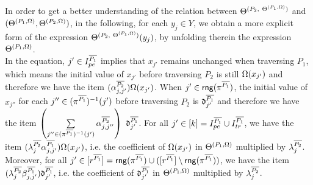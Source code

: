 In order to get a better understanding of the relation between $\Theta^{(P_2,\ \Theta^{(P_1,\Omega)})}$ and $(\Theta^{(P_1, \Omega)},\Theta^{(P_2, \Omega)})$, in the following, for each $y_j \in Y$, we obtain a more explicit form of the expression $\sumf^{(P_2,\ \sumf^{(P_1,\initval)})}(y_j)$, by unfolding therein the expression $\Theta^{(P_1,\Omega)}$\medskip.
\medskip\\
In the equation, $j'\in  I^{\overline{P_1}}_{pe}$ implies that $x_{j'}$ remains unchanged when traversing $P_1$, which means the initial value of $x_{j'}$ before traversing $P_2$ is still $\Omega(x_{j'})$ and therefore we have the item $ (\alpha^{\overline{P_2}}_{j,j'}) \Omega(x_{j'})$. When $j' \in \mathsf{rng}(\pi^{\overline{P_1}})$, the initial value of $x_{j''}$ for each $j'' \in (\pi^{\overline{P_1}})^{-1}(j')$ before traversing $P_2$ is $\mathfrak{d}^{\overline{P_1}}_{j'}$ and therefore we have the item $\left(\sum \limits_{j'' \in (\pi^{\circled{P_1}})^{-1}(j')} \csta^{\circled{P_2}}_{j,j''} \right)\ \vard^{\circled{P_1}}_{j'}$.
For all $j'\in [k] = I^{\overline{P_1}}_{pe} \cup I^{\overline{P_1}}_{tr}$, we have the item $(\lambda^{\overline{P_2}}_{j} \alpha^{\overline{P_1}}_{j,j'}) \Omega(x_{j'})$, i.e. the coefficient of $\Omega(x_{j'})$ in $\Theta^{(P_1, \Omega)}$ multiplied by $\lambda^{\overline{P_2}}_{j}$. Moreover, for all $j'\in [r^{\overline{P_1}}] = \mathsf{rng}(\pi^{\overline{P_1}}) \cup ([r^{\overline{P_1}}] \setminus \mathsf{rng}(\pi^{\overline{P_1}}))$, we have 
the item $( \lambda^{\overline{P_2}}_{j} \beta^{\overline{P_1}}_{j,j'}) \mathfrak{d}^{\overline{P_1}}_{j'}$, i.e. the coefficient of $\mathfrak{d}^{\overline{P_1}}_{j'}$ in $\Theta^{(P_1, \Omega)}$ multiplied by $\lambda^{\overline{P_2}}_{j}$.

